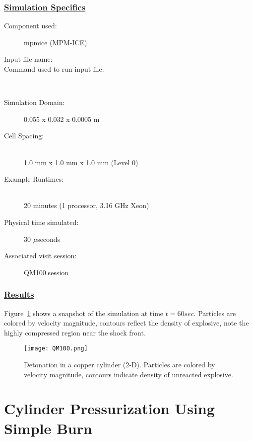 %
\subsubsection*{\underline{Simulation Specifics}}
\begin{description}
\item [Component used:] \hfill mpmice (MPM-ICE)
\item [Input file name:] \hfill {}
\item [Command used to run input file:]\hfill \\

\item [Simulation Domain:]\hfill    0.055 x 0.032 x 0.0005 m

\item [Cell Spacing:]\hfill \\
1.0 mm x 1.0 mm x 1.0 mm (Level 0)

\item [Example Runtimes:] \hfill \\
 20 minutes   (1 processor, 3.16 GHz Xeon)\\

\item [Physical time simulated:] \hfill 30 $\mu$seconds

\item [Associated visit session:] \hfill QM100.session

\end{description}

\subsubsection*{\underline{Results}}

Figure~\ref{fig:QM100} shows a snapshot of the simulation at time $t=60sec$.
Particles are colored by velocity magnitude, contours reflect the density of
explosive, note the highly compressed region near the shock front.
\begin{figure}
  \center
  \texttt{[image: QM100.png]}
  \caption{Detonation in a copper cylinder (2-D).  Particles are colored by
           velocity magnitude, contours indicate density of unreacted
           explosive.}
  \label{fig:QM100}
\end{figure}
%
\newpage

\section*{\center  Cylinder Pressurization Using Simple Burn}

